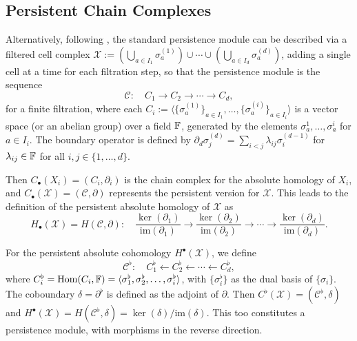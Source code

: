 \subsection{Persistent Chain Complexes}
Alternatively, following \cite[\S 2.6]{de2011dualities}, the standard persistence module
can be described via a filtered cell complex $\mathcal{X}:= (\bigcup_{a \in I_1} \sigma_a^{(1)}) \cup \cdots
\cup (\bigcup_{a \in I_d} \sigma_a^{(d)})$, adding a single cell at a time for each filtration step, so that the persistence module is the sequence
\[
	\mathcal{C}: \quad C_{1} \to C_{2} \to \cdots \to C_{d},
\]
for a finite filtration, where each $C_{i} := \langle \{\sigma^{(1)}_a\}_{a \in I_1}, \ldots, \{\sigma^{(i)}_a\}_{a \in I_i}
\rangle$ is a vector space (or an abelian group) over a field ${\mathbb{F}}$,
generated by the elements $\sigma^{1}_a, \ldots, \sigma^{i}_a$ for $a \in I_i$. The boundary operator
is defined by $\partial_d \sigma^{(d)}_{j} = \sum_{i<j}\lambda_{ij}\sigma^{(d-1)}_{i}$ for $\lambda
_{ij}\in {\mathbb{F}}$ for all $i, j \in \{1, \ldots, d\}$.

Then $C_{\bullet}(X_{i}) = (C_{i},\partial_{i})$ is the chain complex for the absolute
homology of $X_{i}$, and $C_{\bullet}(\mathcal{X}) = (\mathcal{C},\partial)$
represents the persistent version for $\mathcal{X}$. This leads to the definition
of the persistent absolute homology of $\mathcal{X}$ as
\[
	H_{\bullet}(\mathcal{X}) = H(\mathcal{C}, \partial): \quad \frac{\ker(\partial_{1})}{\text{im}(\partial_{1})}
	\to \frac{\ker(\partial_{2})}{\text{im}(\partial_{2})}\to \cdots \to \frac{\ker(\partial_{d})}{\text{im}(\partial_{d})}
	.
\]

For the persistent absolute cohomology $H^{\bullet}(\mathcal{X})$, we define
\[
	\mathcal{C}^{\flat}: \quad C^{\flat}_{1} \leftarrow C^{\flat}_{2} \leftarrow \cdots
	\leftarrow C^{\flat}_{d},
\]
where $C_{i}^{\flat} = \text{Hom}(C_{i}, {\mathbb{F}}) = \langle \sigma_{1}^{\flat}
, \sigma_{2}^{\flat}, \ldots, \sigma_{i}^{\flat} \rangle$, with
$\{\sigma_{i}^{\flat}\}$ as the dual basis of $\{\sigma_{i}\}$. The coboundary $\delta
= \partial^{\flat}$ is defined as the adjoint of $\partial$. Then
$C^{\flat}(\mathcal{X}) = (\mathcal{C}^{\flat}, \delta)$ and
$H^{\bullet}(\mathcal{X}) = H(\mathcal{C}^{\flat}, \delta) = \ker(\delta) / \text{im}
(\delta)$. This too constitutes a persistence module, with morphisms in the
reverse direction.

